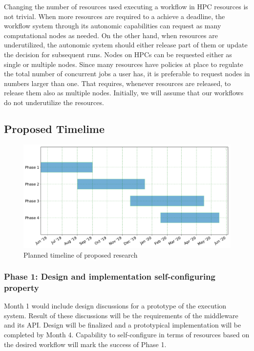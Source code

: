 {Changing the number of resources used executing a workflow in HPC resources is not
trivial. When more resources are required to a achieve a deadline, the workflow system
through its autonomic capabilities can request as many computational nodes as needed. 
On the other hand, when resources are underutilized, the autonomic system should either
release part of them or update the decision for subsequent runs. Nodes on HPCs can be
requested either as single or multiple nodes. Since many resources have policies at place
to regulate the total number of concurrent jobs a user has, it is preferable to request
nodes in numbers larger than one. That requires, whenever resources are released, to
release them also as multiple nodes. Initially, we will assume that our workflows do not
underutilize the resources.


\subsection{Proposed Timelime}
\begin{figure}[t]
	\centering
	\includegraphics[width=.95\textwidth]{figures/phd_plan.pdf}
	\caption{Planned timeline of proposed research}\label{tab:work_plan}
\end{figure}

\subsubsection{Phase 1: Design and implementation self-configuring property}

Month 1 would include design discussions for a prototype of the execution system. 
Result of these discussions will be the requirements of the middleware and its 
API. Design will be finalized and a prototypical implementation will be completed 
by Month 4. Capability to self-configure in terms of resources based on the desired 
workflow will mark the success of Phase 1.

}
